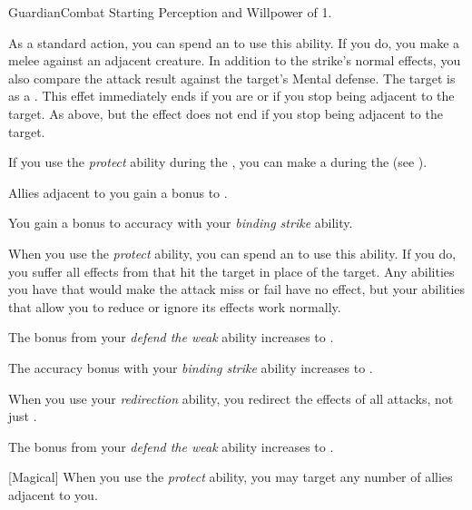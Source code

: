     \begin{feat}{Guardian}{Combat}
        \featpre Starting Perception and Willpower of 1.
        \featben

         As a standard action, you can spend an  to use this ability.
        If you do, you make a melee  against an adjacent creature.
        In addition to the strike's normal effects, you also compare the attack result against the target's Mental defense.
         The target is  as a .
        This effet immediately ends if you are  or if you stop being adjacent to the target.
         As above, but the effect does not end if you stop being adjacent to the target.

         If you use the \textit{protect} ability during the , you can make a  during the  (see ).

         Allies adjacent to you gain a  bonus to .

         You gain a  bonus to accuracy with your \textit{binding strike} ability.

         When you use the \textit{protect} ability, you can spend an  to use this ability.
        If you do, you suffer all effects from  that hit the target in place of the target.
        Any abilities you have that would make the attack miss or fail have no effect, but your abilities that allow you to reduce or ignore its effects work normally.

         The bonus from your \textit{defend the weak} ability increases to .

         The accuracy bonus with your \textit{binding strike} ability increases to .

         When you use your \textit{redirection} ability, you redirect the effects of all attacks, not just .

         The bonus from your \textit{defend the weak} ability increases to .

        [Magical] When you use the \textit{protect} ability, you may target any number of allies adjacent to you.
    \end{feat}

